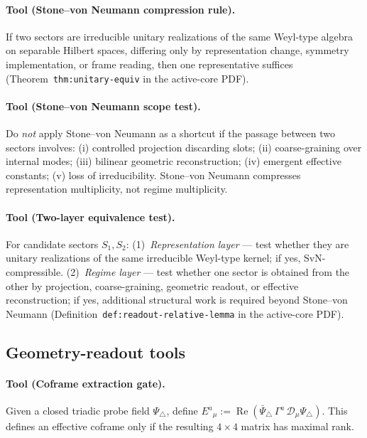\paragraph{Tool (Stone--von Neumann compression rule).}
If two sectors are irreducible unitary realizations of the same
Weyl-type algebra on separable Hilbert spaces, differing only by
representation change, symmetry implementation, or frame reading, then
one representative suffices
(Theorem~\texttt{thm:unitary-equiv} in the active-core PDF).

\paragraph{Tool (Stone--von Neumann scope test).}
Do \emph{not} apply Stone--von Neumann as a shortcut if the passage
between two sectors involves: (i) controlled projection discarding
slots; (ii) coarse-graining over internal modes; (iii) bilinear
geometric reconstruction; (iv) emergent effective constants; (v) loss
of irreducibility. Stone--von Neumann compresses representation
multiplicity, not regime multiplicity.

\paragraph{Tool (Two-layer equivalence test).}
For candidate sectors $S_1, S_2$: (1)~\emph{Representation layer} ---
test whether they are unitary realizations of the same irreducible
Weyl-type kernel; if yes, SvN-compressible. (2)~\emph{Regime layer} ---
test whether one sector is obtained from the other by projection,
coarse-graining, geometric readout, or effective reconstruction; if yes,
additional structural work is required beyond Stone--von Neumann
(Definition~\texttt{def:readout-relative-lemma} in the active-core PDF).

\subsection*{Geometry-readout tools}

\paragraph{Tool (Coframe extraction gate).}
Given a closed triadic probe field $\Psi_\triangle$, define
$E^a{}_\mu := \operatorname{Re}(\bar\Psi_\triangle\,\Gamma^a\,
\mathcal{D}_\mu\Psi_\triangle)$.
This defines an effective coframe only if the resulting $4\times 4$
matrix has maximal rank.

